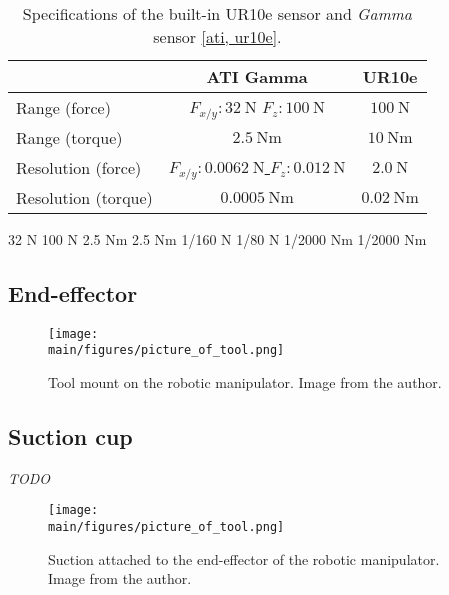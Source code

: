 \documentclass[/home/francois/latex/report/main.tex]{subfiles}
\begin{document}
\begin{table}[h!]
  \begin{center}
    \caption{Specifications of the built-in UR10e sensor and \textit{Gamma} sensor \ref{ati, ur10e}. }
    \label{tab:background:ft-sensor}
    \begin{tabular}{l|c|c} %
      \renewcommand{\arraystretch}{3.5} %
      & \textbf{ATI Gamma} & \textbf{UR10e}\\
      \hline
      Range (force)  & $F_{x/y}: 32 \ \si{\newton}$ $F_z: 100 \ \si{\newton}$ & \underline{$100 \ \si{\newton}$} \\
      \hline
      Range (torque)  & $2.5 \ \si{\newton} \si{\meter}$ & \underline{$10 \ \si{\newton} \si{\meter}$} \\
      \hline
      Resolution (force)  & \underline{$F_{x/y}: 0.0062 \ \si{\newton}$ $F_z: 0.012 \ \si{\newton}$} & $2.0 \ \si{\newton}$ \\
      \hline
      Resolution (torque)  & \underline{$0.0005 \ \si{\newton} \si{\meter}$} & $0.02 \ \si{\newton} \si{\meter}$ \\
    \end{tabular}
  \end{center}
\end{table}

32 N	100 N	2.5 Nm	2.5 Nm	1/160 N	1/80 N	1/2000 Nm	1/2000 Nm

\subsection{End-effector}

\begin{figure}[H]
  \centering
  \texttt{[image: \\main/figures/picture\_of\_tool.png]}
  \caption{Tool mount on the robotic manipulator. Image from the author.}
  \label{fig:background:tool}
\end{figure}


\subsection{Suction cup}

\textit{TODO}

\begin{figure}[H]
  \centering
  \texttt{[image: \\main/figures/picture\_of\_tool.png]}
  \caption{Suction attached to the end-effector of the robotic manipulator. Image from the author.}
  \label{fig:background:albert}
\end{figure}
\end{document}
